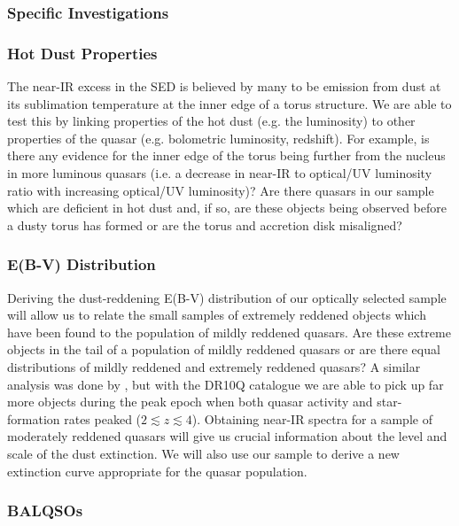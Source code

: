 \subsubsection{Specific Investigations}

\subsubsection{Hot Dust Properties}

The near-IR excess in the SED is believed by many to be emission from dust at its sublimation temperature at the inner edge of a torus structure. We are able to test this by linking properties of the hot dust (e.g. the luminosity) to other properties of the quasar (e.g. bolometric luminosity, redshift). For example, is there any evidence for the inner edge of the torus being further from the nucleus in more luminous quasars (i.e. a decrease in near-IR to optical/UV luminosity ratio with increasing optical/UV luminosity)? Are there quasars in our sample which are deficient in hot dust and, if so, are these objects being observed before a dusty torus has formed or are the torus and accretion disk misaligned? 

\subsubsection{E(B-V) Distribution}

Deriving the dust-reddening E(B-V) distribution of our optically selected sample will allow us to relate the small samples of extremely reddened objects which have been found to the population of mildly reddened quasars. Are these extreme objects in the tail of a population of mildly reddened quasars or are there equal distributions of mildly reddened and extremely reddened quasars? A similar analysis was done by \citet{richards03}, but with the DR10Q catalogue we are able to pick up far more objects during the peak epoch when both quasar activity and star-formation rates peaked ($2 \lesssim z \lesssim 4$). Obtaining near-IR spectra for a sample of moderately reddened quasars will give us crucial information about the level and scale of the dust extinction. We will also use our sample to derive a new extinction curve appropriate for the quasar population.

\subsubsection{BALQSOs}

